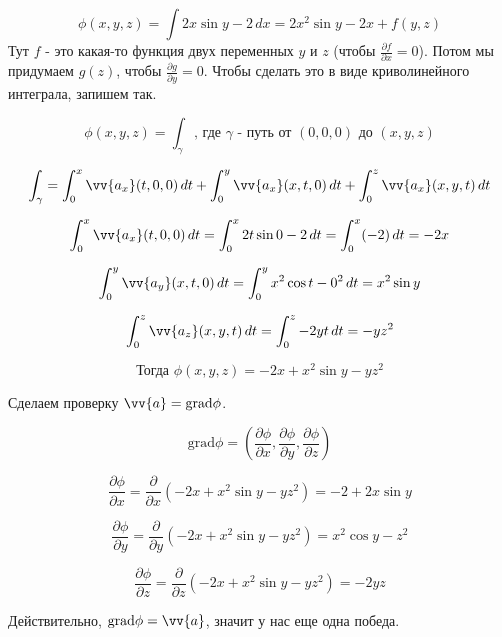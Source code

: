 $$\phi(x,y,z) = \int 2x \sin y - 2\, dx = 2x^2 \sin y - 2x +  f(y,z)$$
Тут $f$ - это какая-то функция двух переменных $y$ и $z$ (чтобы $\frac{\partial f}{\partial x} = 0$). Потом мы придумаем $g(z)$, чтобы $\frac{\partial g}{\partial y} = 0$. Чтобы сделать это в виде криволинейного интеграла, запишем так.

$$\phi(x,y,z) = \int_\gamma \text{, где $\gamma$ - путь от $(0,0,0)$ до $(x,y,z)$}$$

$$\int_\gamma = \int_0^x \vv{a_x}(t,0,0)\,dt + \int_0^y \vv{a_x}(x,t,0)\,dt + \int_0^z \vv{a_x}(x,y,t)\,dt$$

$$\int_0^x \vv{a_x}(t,0,0)\,dt = \int_0^x 2t \sin 0 - 2\,dt = \int_0^x (- 2)\,dt = -2x$$

$$\int_0^y \vv{a_y}(x,t,0)\,dt = \int_0^y x^2 \cos{t} - 0^2 \,dt =x^2 \sin{y} $$

$$\int_0^z \vv{a_z}(x,y,t)\,dt =\int_0^z -2yt\,dt = -yz^2$$

$$\text{Тогда } \phi(x,y,z) = -2x + x^2 \sin{y} - yz^2$$
\begin{center}
    Сделаем проверку $\vv{a} = \text{grad}\phi$.
\end{center}

$$\text{grad}\phi = \left(\dfrac{\partial \phi}{\partial x},\dfrac{\partial \phi}{\partial y}, \dfrac{\partial \phi}{\partial z} \right)$$

$$\dfrac{\partial \phi}{\partial x} = \dfrac{\partial}{\partial x}\left(-2x + x^2 \sin{y} - yz^2\right) = -2 + 2x\sin{y}$$

$$\dfrac{\partial \phi}{\partial y} = \dfrac{\partial}{\partial y}\left(-2x + x^2 \sin{y} - yz^2\right) = x^2\cos{y} - z^2$$

$$\dfrac{\partial \phi}{\partial z} = \dfrac{\partial}{\partial z}\left(-2x + x^2 \sin{y} - yz^2\right) = -2yz$$
\begin{center}
    Действительно, $\text{grad}\phi = \vv{a}$, значит у нас еще одна победа.
\end{center}
    